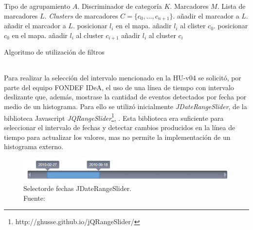 \begin{algorithm}[H]
	\begin{algorithmic}
		\REQUIRE Tipo de agrupamiento $A$.
		\REQUIRE Discriminador de categoría $K$.
		\REQUIRE Marcadores $M$.
		\STATE Lista de marcadores $L$.
		\STATE \textit{Clusters} de marcadores $C = \{c_{0}, \dots, c_{n+1} \}$.
				\STATE añadir el marcador a $L$.
				\STATE añadir el marcador a $L$.
			\ENDIF
		\ENDFOR
				\STATE posicionar $l_{i}$ en el mapa.
			\ENDFOR
				\STATE añadir $l_{i}$ al clister $c_{0}$.
			\ENDFOR
			\STATE posicionar $c_{0}$ en el mapa.
		\ELSE
				\STATE añadir $l_{i}$ al cluster $c_{i+1}$
			\ENDFOR
				\STATE añadir $l_{i}$ al cluster $c_{i}$
			\ENDFOR
		\ENDIF
	\end{algorithmic}
	\caption{Algoritmo de utilización de filtros}
	\label{alg:filtroMarcadores}
\end{algorithm}\vphantom\\

Para realizar la selección del intervalo mencionado en la HU-v04 se solicitó, por parte del equipo FONDEF IDeA, el uso de una línea de tiempo con intervalo deslizante que, además, mostrase la cantidad de eventos detectados por fecha por medio de un histograma. Para ello se utilizó inicialmente \textit{JDateRangeSlider}, de la biblioteca Javascript \textit{JQRangeSlider}\footnote{http://ghusse.github.io/jQRangeSlider/}, \citep{JQRangeSlider}. Esta biblioteca era suficiente para seleccionar el intervalo de fechas y detectar cambios producidos en la línea de tiempo para actualizar los valores, mas no permite la implementación de un histograma externo.

\begin{figure}[H]
	\centering
	\captionsetup{justification=centering}
	\includegraphics[scale=0.6]{images/JDateRangeSlider.png}
	\caption[Selectorde fechas JDateRangeSlider.]{Selectorde fechas JDateRangeSlider.\\Fuente: \citep{JQRangeSlider}}
	\label{fig:JQRangeSlider}
\end{figure}

